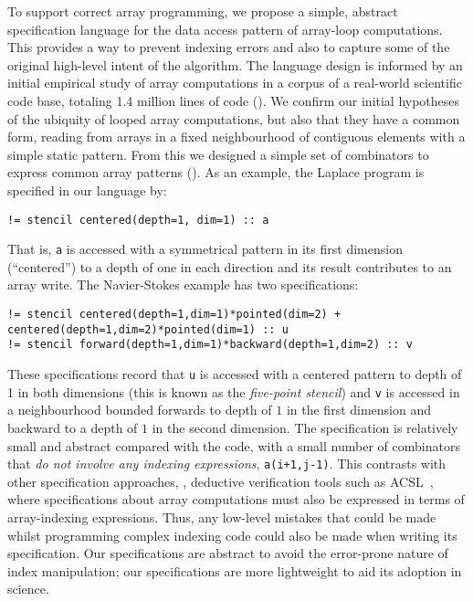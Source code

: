 To support correct array programming, we propose a simple,
abstract specification language for the data access pattern of
array-loop computations. This provides a way to prevent
indexing errors and also to capture some of the original high-level intent of the algorithm. The language design is informed by an initial
empirical study of array computations in a corpus of a real-world
scientific code base, totaling 1.4 million lines of
code (). We confirm our initial hypotheses of the
ubiquity of looped array computations, but also that they have a
common form, reading from arrays in a fixed neighbourhood of
contiguous elements with a simple static pattern. From this we
designed a simple set of combinators to express common array patterns ().
As an example, the Laplace program is specified in our language by:
%
\begin{verbatim}
!= stencil centered(depth=1, dim=1) :: a
\end{verbatim}
%
That is, \texttt{a} is accessed with a symmetrical pattern in its
first dimension (``centered'') to a depth of one in each direction and
its result contributes to an array
write.  The Navier-Stokes example has two specifications:
%
\begin{verbatim}
!= stencil centered(depth=1,dim=1)*pointed(dim=2) + centered(depth=1,dim=2)*pointed(dim=1) :: u
!= stencil forward(depth=1,dim=1)*backward(depth=1,dim=2) :: v
\end{verbatim}
%
These specifications record that \texttt{u}
is accessed with a centered pattern to depth of 1 in both dimensions
(this is known as the \emph{five-point stencil}) and \texttt{v} is
accessed in a neighbourhood bounded forwards to depth of $1$ in the
first dimension and backward to a depth of $1$ in the second
dimension. The specification is relatively small and abstract compared
with the code, with a small number of combinators that \emph{do not
  involve any indexing expressions}, \eg{} \texttt{a(i+1,j-1)}. This
contrasts with other specification approaches, \eg{}, deductive
verification tools such as ACSL~\citet{baudin2008acsl}, where
specifications about array computations must also be expressed in
terms of array-indexing expressions. Thus, any low-level mistakes that
could be made whilst programming complex indexing code could also be
made when writing its specification. Our specifications are
abstract to avoid the error-prone nature of index manipulation; our
specifications are more lightweight to aid its adoption in science.

